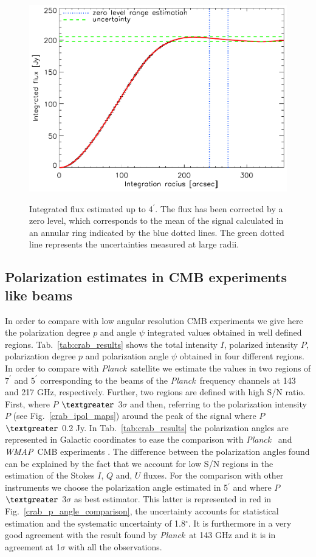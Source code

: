 \documentclass[twocolumn,traditabstract]{aa}
\def\Planck{\textit{Planck}}
\def\WMAP{\textit{WMAP}}
\begin{document}
\begin{figure}[h!]
  \centering
     { \includegraphics[width=0.85\linewidth,keepaspectratio]{figures/Crab_integrated_flux_2mm.pdf}}
     \caption{Integrated flux estimated up to 4$^{\prime}$. The flux has been corrected by a zero level, which corresponds to the mean of the signal calculated in an annular ring indicated by the blue dotted lines. The green dotted line represents the uncertainties measured at large radii.}
\label{crab_integrated_flux}
\end{figure}

\subsection{Polarization estimates in CMB experiments like beams}
In order to compare with low angular resolution CMB experiments we give here the polarization degree $p$ and angle $\psi$ integrated values obtained in well defined regions. 
Tab.~\ref{tab:crab_results} shows the total intensity $I$, polarized intensity $P$, polarization degree $p$ and polarization angle $\psi$ obtained in four different regions. In order to compare with \Planck\ satellite we estimate the values in two regions of $7^{\prime}$ and $5^{\prime}$ corresponding to the beams of the \Planck\ frequency channels at 143 and 217 GHz, respectively. 
Further, two regions are defined with high S/N ratio. First, where $P$ $\textgreater$ $3\sigma$ and then, referring to the polarization intensity $P$ (see Fig.~\ref{crab_ipol_maps}) around the peak of the signal where $P$ $\textgreater$ 0.2 Jy. 
In Tab.~\ref{tab:crab_results} the polarization angles are represented in Galactic coordinates to ease the comparison with \Planck\ \citep{2015arXiv150702058P} and \WMAP\ CMB experiments \citep{2011ApJS..192...19W}. 
The difference between the polarization angles found can be explained by the fact that we account for low S/N regions in the estimation of the Stokes $I$, $Q$ and, $U$ fluxes. For the comparison with other instruments we choose the polarization angle estimated in 5$^{\prime}$ and where $P$ $\textgreater$ 3$\sigma$ as best estimator. This latter is represented in red in Fig.~\ref{crab_p_angle_comparison}, the uncertainty accounts for statistical estimation and the systematic uncertainty of 1.8$^\circ$. It is furthermore in a very good agreement with the result found by \Planck\ at 143 GHz and it is in agreement at 1$\sigma$ with all the observations.
\end{document}
